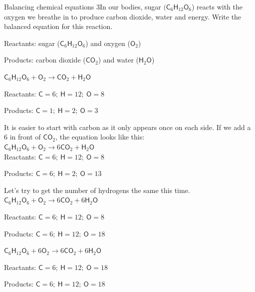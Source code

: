       \noindent
\begin{wex}{Balancing chemical equations 3}{In our bodies, sugar ${(\mathsf{C}_{6}\mathsf{H}_{12}\mathsf{O}_{6}}$) reacts with the oxygen we breathe in to produce carbon dioxide, water and energy. Write the balanced equation for this reaction.}

{
Reactants: sugar (${\mathsf{C}_{6}\mathsf{H}_{12}\mathsf{O}_{6}}$) and oxygen (${\mathsf{O}_{2}}$)

Products: carbon dioxide (${\mathsf{CO}_{2}}$) and water (${\mathsf{H}_{2}\mathsf{O}}$)\\
}
{
    $\mathsf{C}_{6}\mathsf{H}_{12}\mathsf{O}_{6} + \mathsf{O}_{2} \rightarrow \mathsf{CO}_{2} + \mathsf{H}_{2}\mathsf{O}$
}
{
   Reactants: $\mathsf{C} = 6;~ \mathsf{H} = 12; ~\mathsf{O} = 8$

   Products: $\mathsf{C} = 1;~ \mathsf{H} = 2; ~\mathsf{O} = 3$
}
{
   It is easier to start with carbon as it only appears once on each side. If we add a $6$ in front of ${\mathsf{CO}_{2}}$, the equation looks like this:\\
    $\mathsf{C}_{6}\mathsf{H}_{12}\mathsf{O}_{6} + \mathsf{O}_{2} \rightarrow 6\mathsf{CO}_{2} + \mathsf{H}_{2}\mathsf{O}$\\

   Reactants: $\mathsf{C} = 6;~ \mathsf{H} = 12; ~\mathsf{O} = 8$

   Products: $\mathsf{C} = 6;~ \mathsf{H} = 2; ~\mathsf{O} = 13$
}
{
Let's try to get the number of hydrogens the same this time.\\
    $\mathsf{C}_{6}\mathsf{H}_{12}\mathsf{O}_{6} + \mathsf{O}_{2} \rightarrow 6\mathsf{CO}_{2} + 6\mathsf{H}_{2}\mathsf{O}$

   Reactants: $\mathsf{C} = 6;~ \mathsf{H} = 12; ~\mathsf{O} = 8$

   Products: $\mathsf{C} = 6;~ \mathsf{H} = 12; ~\mathsf{O} = 18$
}
{
  $\mathsf{C}_{6}\mathsf{H}_{12}\mathsf{O}_{6} + 6\mathsf{O}_{2} \rightarrow 6\mathsf{CO}_{2} + 6\mathsf{H}_{2}\mathsf{O}$

   Reactants: $\mathsf{C} = 6;~ \mathsf{H} = 12; ~\mathsf{O} = 18$

   Products: $\mathsf{C} = 6;~ \mathsf{H} = 12; ~\mathsf{O} = 18$
}
\end{wex}
